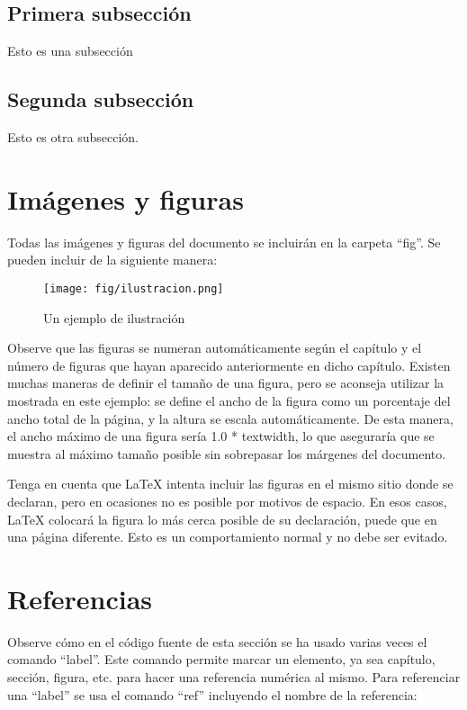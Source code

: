 \subsection{Primera subsección}\label{sec:subseccion}
Esto es una subsección

\subsection{Segunda subsección}
Esto es otra subsección.

\section{Imágenes y figuras}
Todas las imágenes y figuras del documento se incluirán en la carpeta ``fig''. Se pueden incluir de la siguiente manera:

\begin{figure}[htp]
    \centering
    \texttt{[image: fig/ilustracion.png]}
    \caption{Un ejemplo de ilustración}
    \label{fig:ejemplo}
\end{figure}

Observe que las figuras se numeran automáticamente según el capítulo y el número de figuras que hayan aparecido anteriormente en dicho capítulo. Existen muchas maneras de definir el tamaño de una figura, pero se aconseja utilizar la mostrada en este ejemplo: se define el ancho de la figura como un porcentaje del ancho total de la página, y la altura se escala automáticamente. De esta manera, el ancho máximo de una figura sería 1.0 * textwidth, lo que aseguraría que se muestra al máximo tamaño posible sin sobrepasar los márgenes del documento.

Tenga en cuenta que LaTeX intenta incluir las figuras en el mismo sitio donde se declaran, pero en ocasiones no es posible por motivos de espacio. En esos casos, LaTeX colocará la figura lo más cerca posible de su declaración, puede que en una página diferente. Esto es un comportamiento normal y no debe ser evitado.

\section{Referencias}
Observe cómo en el código fuente de esta sección se ha usado varias veces el comando ``label''. Este comando permite marcar un elemento, ya sea capítulo, sección, figura, etc. para hacer una referencia numérica al mismo. Para referenciar una ``label'' se usa el comando ``ref'' incluyendo el nombre de la referencia:

